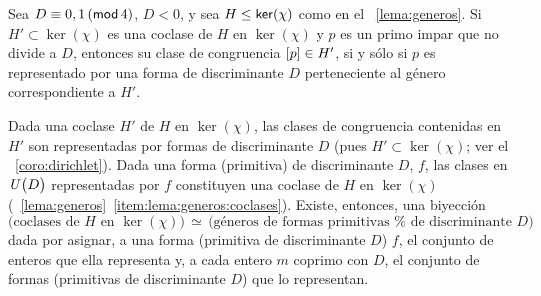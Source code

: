 \begin{teoGenerosB}\label{teo:generos}
	Sea $D\equiv 0,1\tmodulo[4]$, $D<0$, y sea $H\subgrpeq\ker(\chi)$
	como en el \lemaname~\ref{lema:generos}. Si $H'\subset\ker(\chi)$
	es una coclase de $H$ en $\ker(\chi)$ y $p$ es un primo impar
	que no divide a $D$, entonces su clase de congruencia
	$\clase p\in H'$, si y s\'olo si $p$ es representado por una forma
	de discriminante $D$ perteneciente al g\'enero correspondiente a $H'$.
\end{teoGenerosB}

\begin{obsGenerosB}\label{obs:generos:correspondencia}
	Dada una coclase $H'$ de $H$ en $\ker(\chi)$, las clases de
	congruencia contenidas en $H'$ son representadas por formas
	de discriminante $D$ (pues $H'\subset\ker(\chi)$; ver el
	\coroname~\ref{coro:dirichlet}).
	Dada una forma (primitiva) de discriminante $D$, $f$,
	las clases en $\Unidadesmod[D]$ representadas por $f$
	constituyen una coclase de $H$ en $\ker(\chi)$
	(\lemaname~\ref{lema:generos}~\eqref{item:lema:generos:coclases}).
	Existe, entonces, una biyecci\'on
	\begin{displaymath}
		\big(
			\text{coclases de }
			H\text{ en }\ker(\chi)
		\big)\,\simeq\,
		\big(
			\text{g\'eneros de formas primitivas %
				de discriminante } D
		\big)
	\end{displaymath}
	dada por asignar, a una forma (primitiva de discriminante $D$) $f$,
	el conjunto de enteros que ella representa
	y, a cada entero $m$ coprimo con $D$, el conjunto de formas
	(primitivas de discriminante $D$) que lo representan.
\end{obsGenerosB}

